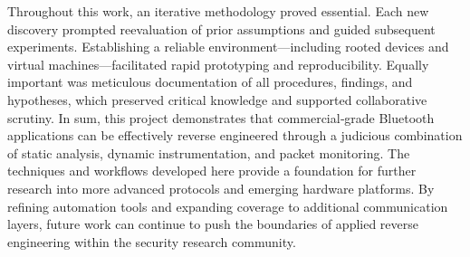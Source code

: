 Throughout this work, an iterative methodology proved essential. Each new discovery prompted reevaluation of prior assumptions and guided subsequent experiments. Establishing a reliable environment—including rooted devices and virtual machines—facilitated rapid prototyping and reproducibility. Equally important was meticulous documentation of all procedures, findings, and hypotheses, which preserved critical knowledge and supported collaborative scrutiny.
In sum, this project demonstrates that commercial‑grade Bluetooth applications can be effectively reverse engineered through a judicious combination of static analysis, dynamic instrumentation, and packet monitoring. The techniques and workflows developed here provide a foundation for further research into more advanced protocols and emerging hardware platforms. By refining automation tools and expanding coverage to additional communication layers, future work can continue to push the boundaries of applied reverse engineering within the security research community.

